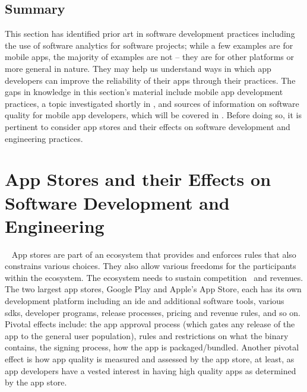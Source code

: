 \subsection{Summary}
This section has identified prior art in software development practices including the use of software analytics for software projects; while a few examples are for mobile apps, the majority of examples are not -- they are for other platforms or more general in nature. They may help us understand ways in which app developers can improve the reliability of their apps through their practices. The gaps in knowledge in this section's material include mobile app development practices, %
a topic investigated shortly in , and sources of information on software quality for mobile app developers, which will be covered in . %
Before doing so, it is pertinent to consider app stores and their effects on software development and engineering practices. %



\section{App Stores and their Effects on Software Development and Engineering}~\label{rw-app-stores-and-their-effects-on-software-development-and-engineering}
App stores are part of an ecosystem that provides and enforces rules that also constrains various choices. They also allow various freedoms for the participants within the ecosystem. The ecosystem needs to sustain competition~ and revenues. The two largest app stores, Google Play and Apple's App Store, each has its own development platform including an \Gls{ide} and additional software tools, various \Glspl{sdk}, developer programs, release processes, pricing and revenue rules, and so on. 
Pivotal effects include: the app approval process (which gates any release of the app to the general user population), rules and restrictions on what the binary contains, the signing process, how the app is packaged/bundled. Another pivotal effect is how app quality is measured and assessed by the app store, at least, as app developers have a vested interest in having high quality apps as determined by the app store.

